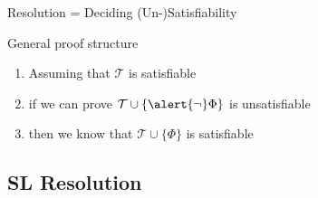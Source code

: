 \documentclass[presentation]{beamer}\mode<presentation>{\usetheme{AMSBolognaFC}}
\begin{document}
\begin{frame}[allowframebreaks]{Resolution = Deciding (Un-)Satisfiability}
    \begin{exampleblock}{General proof structure}
        \begin{enumerate}
            \item Assuming that $\mathcal{T}$ is satisfiable

            \item if we can prove $\mathcal{T} \cup \{ \alert{\neg} \Phi \}$ is unsatisfiable

            \item then we know that $\mathcal{T} \cup \{ \Phi \}$ is satisfiable
        \end{enumerate}
    \end{exampleblock}
\end{frame}

\subsection{SL Resolution}
\end{document}
